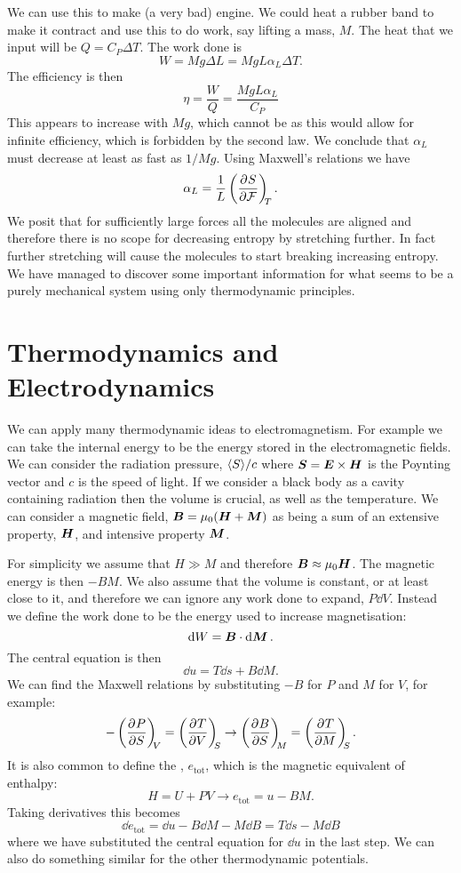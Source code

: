 \documentclass[a4paper]{article}
\newcommand{\tot}{{\mathrm{tot}}}
\begin{document}
    We can use this to make (a very bad) engine.
    We could heat a rubber band to make it contract and use this to do work, say lifting a mass, \(M\).
    The heat that we input will be \(Q = C_P\Delta T\).
    The work done is
    \[W = Mg\Delta L = MgL\alpha_L\Delta T.\]
    The efficiency is then
    \[\eta = \frac{W}{Q} = \frac{MgL\alpha_L}{C_P}\]
    This appears to increase with \(Mg\), which cannot be as this would allow for infinite efficiency, which is forbidden by the second law.
    We conclude that \(\alpha_L\) must decrease at least as fast as \(1/Mg\).
    Using Maxwell's relations we have
    \[\alpha_L = \frac{1}{L}\left(\pdv[]{S}{\mathcal{F}}\right)_{\!\!{T}}.\]
    We posit that for sufficiently large forces all the molecules are aligned and therefore there is no scope for decreasing entropy by stretching further.
    In fact further stretching will cause the molecules to start breaking increasing entropy.
    We have managed to discover some important information for what seems to be a purely mechanical system using only thermodynamic principles.
    
    \section{Thermodynamics and Electrodynamics}
    We can apply many thermodynamic ideas to electromagnetism.
    For example we can take the internal energy to be the energy stored in the electromagnetic fields.
    We can consider the radiation pressure, \(\langle{S}\rangle/c\) where \(\bm{S} = \bm{E}\times\bm{H}\) is the Poynting vector and \(c\) is the speed of light.
    If we consider a black body as a cavity containing radiation then the volume is crucial, as well as the temperature.
    We can consider a magnetic field, \(\bm{B} = \mu_0(\bm{H} + \bm{M})\) as being a sum of an extensive property, \(\bm{H}\), and intensive property \(\bm{M}\).
    
    For simplicity we assume that \(H \gg M\) and therefore \(\bm{B} \approx \mu_0\bm{H}\).
    The magnetic energy is then \(-BM\).
    We also assume that the volume is constant, or at least close to it, and therefore we can ignore any work done to expand, \(P\dd{V}\).
    Instead we define the work done to be the energy used to increase magnetisation:
    \[\dd{W} = \bm{B}\cdot\dd{\bm{M}}.\]
    The central equation is then
    \[\dd{u} = T\dd{s} + B\dd{M}.\]
    We can find the Maxwell relations by substituting \(-B\) for \(P\) and \(M\) for \(V\), for example:
    \[-\pdvconst{P}{S}{V} = \pdvconst{T}{V}{S} \rightarrow \pdvconst{B}{S}{M} = \pdvconst{T}{M}{S}.\]
    It is also common to define the , \(e_{\tot}\), which is the magnetic equivalent of enthalpy:
    \[H = U + PV \rightarrow e_{\tot} = u - BM.\]
    Taking derivatives this becomes
    \[\dd{e_{\tot}} = \dd{u} - B\dd{M} - M\dd{B} = T\dd{s} - M\dd{B}\]
    where we have substituted the central equation for \(\dd{u}\) in the last step.
    We can also do something similar for the other thermodynamic potentials.
    
\end{document}
